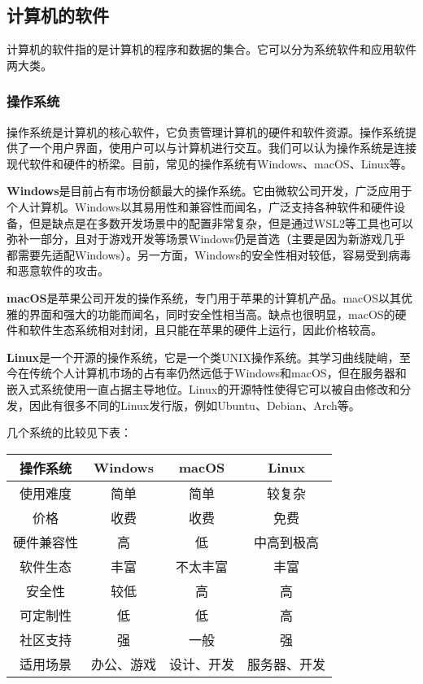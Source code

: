 \documentclass[../main.tex]{subfiles}
\begin{document}
\subsection{计算机的软件}

计算机的软件指的是计算机的程序和数据的集合。它可以分为系统软件和应用软件两大类。

\subsubsection{操作系统}

操作系统是计算机的核心软件，它负责管理计算机的硬件和软件资源。操作系统提供了一个用户界面，使用户可以与计算机进行交互。我们可以认为操作系统是连接现代软件和硬件的桥梁。目前，常见的操作系统有Windows、macOS、Linux等。

\textbf{Windows}\faWindows 是目前占有市场份额最大的操作系统。它由微软公司开发，广泛应用于个人计算机。Windows以其易用性和兼容性而闻名，广泛支持各种软件和硬件设备，但是缺点是在多数开发场景中的配置非常复杂，但是通过WSL2等工具也可以弥补一部分，且对于游戏开发等场景Windows仍是首选（主要是因为新游戏几乎都需要先适配Windows）。另一方面，Windows的安全性相对较低，容易受到病毒和恶意软件的攻击。

\textbf{macOS}\faApple 是苹果公司开发的操作系统，专门用于苹果的计算机产品。macOS以其优雅的界面和强大的功能而闻名，同时安全性相当高。缺点也很明显，macOS的硬件和软件生态系统相对封闭，且只能在苹果的硬件上运行，因此价格较高。

\textbf{Linux}\faLinux 是一个开源的操作系统，它是一个类UNIX操作系统。其学习曲线陡峭，至今在传统个人计算机市场的占有率仍然远低于Windows和macOS，但在服务器和嵌入式系统使用一直占据主导地位。Linux的开源特性使得它可以被自由修改和分发，因此有很多不同的Linux发行版，例如Ubuntu、Debian、Arch等。

几个系统的比较见下表：

\begin{table}[ht]
  \centering
  \begin{tabular}{c|ccc}
    \toprule
    操作系统 & Windows & macOS & Linux \\
    \midrule
    使用难度 & 简单 & 简单 & 较复杂 \\
    价格 & 收费 & 收费 & 免费 \\
    硬件兼容性 & 高 & 低 & 中高到极高 \\
    软件生态 & 丰富 & 不太丰富 & 丰富 \\
    安全性 & 较低 & 高 & 高 \\
    可定制性 & 低 & 低 & 高 \\
    社区支持 & 强 & 一般 & 强 \\
    适用场景 & 办公、游戏 & 设计、开发 & 服务器、开发 \\
    \bottomrule
  \end{tabular}
\end{table}
\end{document}
